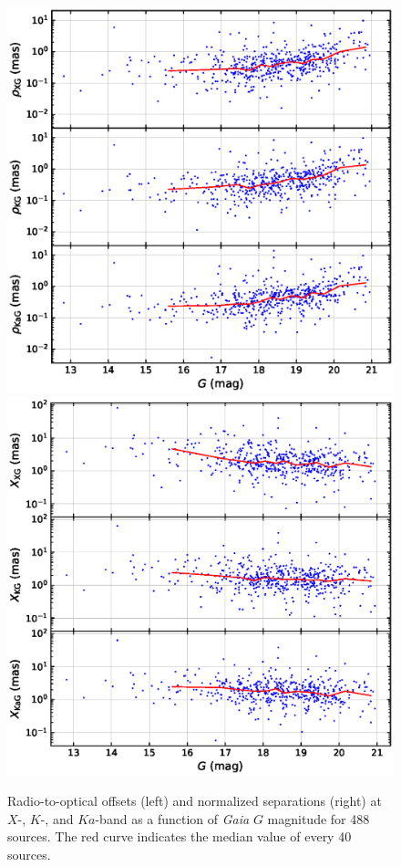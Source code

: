 \documentclass{aa}
\begin{document}
    \begin{figure}[hbtp]
        \centering
        \includegraphics[width=0.7\columnwidth]{figs/rho-g-mag}
        \includegraphics[width=0.7\columnwidth]{figs/X-g-mag}
        \caption[]{\label{fig:rho-g-mag}
            Radio-to-optical offsets (left) and normalized separations (right) at $X$-, $K$-, and $Ka$-band as a function of \textit{Gaia} $G$ magnitude for 488 sources.
            The red curve indicates the median value of every 40 sources.
        }
    \end{figure}
\end{document}
